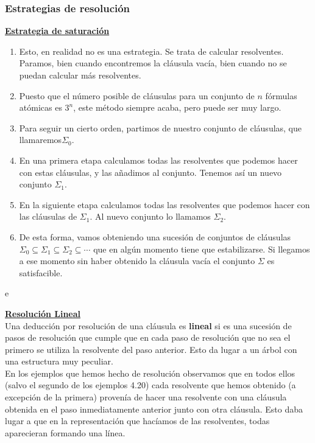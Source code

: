 \subsubsection{Estrategias de resolución}
\underline{\textbf{Estrategia de saturación}}
\begin{enumerate}
    \item Esto, en realidad no es una estrategia. Se trata de calcular resolventes. Paramos, bien cuando encontremos la cláusula vacía, bien cuando no se puedan calcular más resolventes.
    \item Puesto que el número posible de cláusulas para un conjunto de $n$ fórmulas atómicas es $3^n$, este método siempre acaba, pero puede ser muy largo.
    \item Para seguir un cierto orden, partimos de nuestro conjunto de cláusulas, que llamaremos$\Sigma_0$.
    \item En una primera etapa calculamos todas las resolventes que podemos hacer con estas cláusulas, y las añadimos al conjunto. Tenemos así un nuevo conjunto $\Sigma_1$.
    \item En la siguiente etapa calculamos todas las resolventes que podemos hacer con las cláusulas de $\Sigma_1$. Al nuevo conjunto lo llamamos $\Sigma_2$.
    \item De esta forma, vamos obteniendo una sucesión de conjuntos de cláusulas $\Sigma_0 \subseteq \Sigma_1 \subseteq \Sigma_2 \subseteq \cdots$ que en algún momento tiene que estabilizarse. Si llegamos a ese momento sin haber obtenido la cláusula vacía el conjunto $\Sigma$ es satisfacible.
\end{enumerate}

\begin{ejemplo}
    e
\end{ejemplo}

\underline{\textbf{Resolución Lineal}} \\

Una deducción por resolución de una cláusula es \textbf{lineal} si es una sucesión de pasos de resolución que cumple que en cada paso de resolución que no sea el primero se utiliza la resolvente del paso anterior. Esto da lugar a un árbol con una estructura muy peculiar. \\
En los ejemplos que hemos hecho de resolución observamos que en todos ellos (salvo el segundo de los ejemplos 4.20) cada resolvente que hemos obtenido (a excepción de la primera) provenía de hacer una resolvente con una cláusula obtenida en el paso inmediatamente anterior junto con otra cláusula. Esto daba lugar a que en la representación que hacíamos de las resolventes, todas aparecieran formando una línea.

